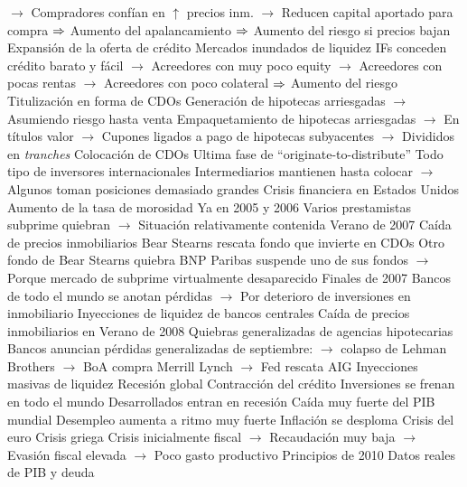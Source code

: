 \documentclass{nuevotema}
\begin{document}
\begin{esquemal}
				\4[] $\to$ Compradores confían en $\uparrow$ precios inm.
				\4[] $\to$ Reducen capital aportado para compra
				\4[] $\then$ Aumento del apalancamiento
				\4[] $\then$ Aumento del riesgo si precios bajan
				\4 Expansión de la oferta de crédito
				\4[] Mercados inundados de liquidez
				\4[] IFs conceden crédito barato y fácil
				\4[] $\to$ Acreedores con muy poco equity
				\4[] $\to$ Acreedores con pocas rentas
				\4[] $\to$ Acreedores con poco colateral
				\4[] $\then$ Aumento del riesgo
				\4 Titulización en forma de CDOs
				\4[] Generación de hipotecas arriesgadas
				\4[] $\to$ Asumiendo riesgo hasta venta
				\4[] Empaquetamiento de hipotecas arriesgadas
				\4[] $\to$ En títulos valor
				\4[] $\to$ Cupones ligados a pago de hipotecas subyacentes
				\4[] $\to$ Divididos en \textit{tranches}
				\4 Colocación de CDOs
				\4[] Ultima fase de ``originate-to-distribute''
				\4[] Todo tipo de inversores internacionales
				\4[] Intermediarios mantienen hasta colocar
				\4[] $\to$ Algunos toman posiciones demasiado grandes
			\3 Crisis financiera en Estados Unidos
				\4 Aumento de la tasa de morosidad
				\4[] Ya en 2005 y 2006
				\4[] Varios prestamistas subprime quiebran
				\4[] $\to$ Situación relativamente contenida
				\4 Verano de 2007
				\4[] Caída de precios inmobiliarios
				\4[] Bear Stearns rescata fondo que invierte en CDOs
				\4[] Otro fondo de Bear Stearns quiebra
				\4[] BNP Paribas suspende uno de sus fondos
				\4[] $\to$ Porque mercado de subprime virtualmente desaparecido
				\4 Finales de 2007
				\4[] Bancos de todo el mundo se anotan pérdidas
				\4[] $\to$ Por deterioro de inversiones en inmobiliario
				\4[] Inyecciones de liquidez de bancos centrales
				\4[] Caída de precios inmobiliarios en
				\4 Verano de 2008
				\4[] Quiebras generalizadas de agencias hipotecarias
				\4[] Bancos anuncian pérdidas generalizadas
				 de septiembre:
				\4[] $\to$ colapso de Lehman Brothers
				\4[] $\to$ BoA compra Merrill Lynch
				\4[] $\to$ Fed rescata AIG
				\4[] Inyecciones masivas de liquidez
			\3 Recesión global
				\4 Contracción del crédito
				\4 Inversiones se frenan en todo el mundo
				\4 Desarrollados entran en recesión
				\4[$\then$] Caída muy fuerte del PIB mundial
				\4[$\then$] Desempleo aumenta a ritmo muy fuerte
				\4[$\then$] Inflación se desploma
			\3 Crisis del euro
				\4 Crisis griega
				\4[] Crisis inicialmente fiscal
				\4[] $\to$ Recaudación muy baja
				\4[] $\to$ Evasión fiscal elevada
				\4[] $\to$ Poco gasto productivo
				\4[] Principios de 2010
				\4[] Datos reales de PIB y deuda

\end{esquemal}
\end{document}
